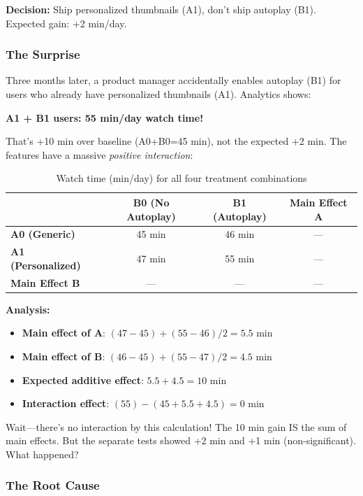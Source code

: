 \textbf{Decision:} Ship personalized thumbnails (A1), don't ship autoplay (B1). Expected gain: +2 min/day.

\subsubsection{The Surprise}

Three months later, a product manager accidentally enables autoplay (B1) for users who already have personalized thumbnails (A1). Analytics shows:

\textbf{A1 + B1 users: 55 min/day watch time!}

That's +10 min over baseline (A0+B0=45 min), not the expected +2 min. The features have a massive \textit{positive interaction}:

\begin{table}[h]
\centering
\begin{tabular}{lccc}
\toprule
& \textbf{B0 (No Autoplay)} & \textbf{B1 (Autoplay)} & \textbf{Main Effect A} \\
\midrule
\textbf{A0 (Generic)} & 45 min & 46 min & --- \\
\textbf{A1 (Personalized)} & 47 min & 55 min & --- \\
\textbf{Main Effect B} & --- & --- & --- \\
\bottomrule
\end{tabular}
\caption{Watch time (min/day) for all four treatment combinations}
\end{table}

\textbf{Analysis:}
\begin{itemize}
    \item \textbf{Main effect of A}: $(47 - 45) + (55 - 46) / 2 = 5.5$ min
    \item \textbf{Main effect of B}: $(46 - 45) + (55 - 47) / 2 = 4.5$ min
    \item \textbf{Expected additive effect}: $5.5 + 4.5 = 10$ min
    \item \textbf{Interaction effect}: $(55) - (45 + 5.5 + 4.5) = 0$ min
\end{itemize}

Wait---there's no interaction by this calculation! The 10 min gain IS the sum of main effects. But the separate tests showed +2 min and +1 min (non-significant). What happened?

\subsubsection{The Root Cause}

